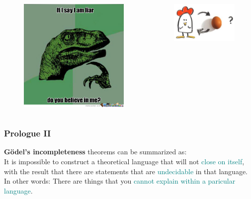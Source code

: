 \documentclass[
	11pt,
	aspectratio=169,
]{beamer}
\begin{document}
\begin{frame}
\begin{columns}
\begin{figure}
				\includegraphics[width=\textwidth]{resources/liar.jpg}
			\end{figure}
			\begin{figure}
				\includegraphics[width=\textwidth]{resources/chickenegg.jpg}
			\end{figure}
	\end{columns}
\end{frame}

\begin{frame}
\frametitle{Prologue II}
	{\textbf{Gödel's incompleteness} theorems can be summarized as: \\
		It is impossible to construct a theoretical language that will not \textcolor{teal}{close on itself}, with the result that there are statements that are \textcolor{teal}{undecidable} in that language.} \\
	\vspace{0.5cm}
	{In other words: There are things that you \textcolor{teal}{cannot explain within a paricular language}.}
	
\end{frame}
\end{document}
